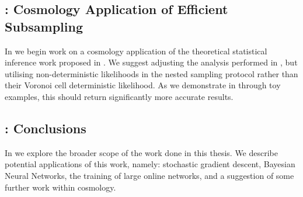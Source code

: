 \subsection*{: Cosmology Application of Efficient Subsampling}

In  we begin work on a cosmology application of the theoretical statistical inference work proposed in . We suggest adjusting the analysis performed in \cite{Mihaylov_2020}, but utilising non-deterministic likelihoods in the nested sampling protocol rather than their Voronoi cell deterministic likelihood. As we demonstrate in  through toy examples, this should return significantly more accurate results.

\subsection*{: Conclusions}

In  we explore the broader scope of the work done in this thesis. We describe potential applications of this work, namely: stochastic gradient descent, Bayesian Neural Networks, the training of large online networks, and a suggestion of some further work within cosmology.